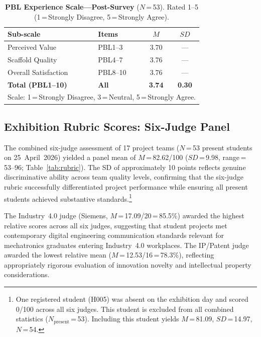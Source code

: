 \documentclass[utf8]{FrontiersinHarvard}
\begin{document}
\begin{table}[h]
\caption{\textbf{PBL Experience Scale---Post-Survey} ($N$\,=\,53). Rated
1--5 (1\,=\,Strongly Disagree, 5\,=\,Strongly Agree).}
\label{tab:pbl}
\begin{tabular}{llcc}
\toprule
\textbf{Sub-scale} & \textbf{Items} & \textbf{$M$} & \textbf{$SD$} \\
\midrule
Perceived Value            & PBL1--3  & 3.70 & ---  \\
Scaffold Quality           & PBL4--7  & 3.76 & ---  \\
Overall Satisfaction       & PBL8--10 & 3.76 & ---  \\
\textbf{Total (PBL1--10)} & \textbf{All} & \textbf{3.74} & \textbf{0.30} \\
\bottomrule
\multicolumn{4}{l}{\small Scale: 1\,=\,Strongly Disagree, 3\,=\,Neutral, 5\,=\,Strongly Agree.}
\end{tabular}
\end{table}

\subsection{Exhibition Rubric Scores: Six-Judge Panel}

The combined six-judge assessment of 17 project teams ($N$\,=\,53 present
students on 25~April~2026) yielded a panel mean of $M$\,=\,82.62/100
($SD$\,=\,9.98, range\,=\,53--96; Table~\ref{tab:rubric}). The SD of
approximately 10 points reflects genuine discriminative ability across
team quality levels, confirming that the six-judge rubric successfully
differentiated project performance while ensuring all present students
achieved substantive standards.\footnote{One registered student (H005) was
absent on the exhibition day and scored 0/100 across all six judges. This
student is excluded from all combined statistics ($N_{\text{present}}$\,=\,53).
Including this student yields $M$\,=\,81.09, $SD$\,=\,14.97, $N$\,=\,54.}

The Industry~4.0 judge (Siemens, $M$\,=\,17.09/20\,=\,85.5\%) awarded the
highest relative scores across all six judges, suggesting that student
projects met contemporary digital engineering communication standards relevant
for mechatronics graduates entering Industry~4.0 workplaces. The IP/Patent
judge awarded the lowest relative mean ($M$\,=\,12.53/16\,=\,78.3\%),
reflecting appropriately rigorous evaluation of innovation novelty and
intellectual property considerations.
\end{document}
